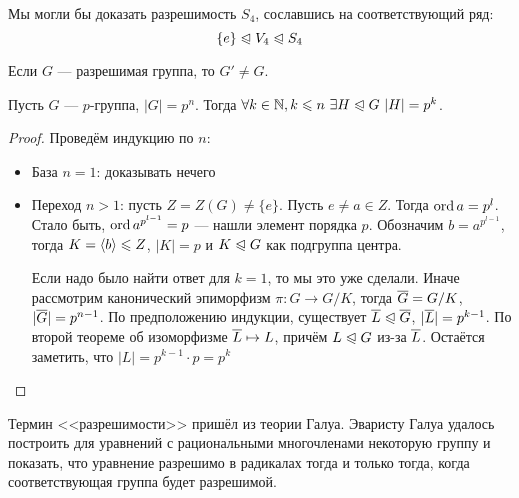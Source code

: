 \begin{note}
	Мы могли бы доказать разрешимость $S_4$, сославшись на соответствующий ряд:
	\[
		\{e\} \trianglelefteqslant V_4 \trianglelefteqslant S_4
	\]
\end{note}

\begin{corollary}
	Если $G$ --- разрешимая группа, то $G' \neq G$.
\end{corollary}

\begin{theorem}
	Пусть $G$ --- $p$-группа, $|G| = p^n$. Тогда $\forall k \in \mathbb{N}, k \leqslant n\ \exists H \trianglelefteqslant G\ |H| = p^k$.
\end{theorem}

\begin{proof}
	Проведём индукцию по $n$:
	\begin{itemize}
		\item База $n = 1$: доказывать нечего
		
		\item Переход $n > 1$: пусть $Z = Z(G) \neq \{e\}$. Пусть $e \neq a \in Z$. Тогда $\operatorname{ord} a = p^l$. Стало быть, $\operatorname{ord} a^{p^{l - 1}} = p$ --- нашли элемент порядка $p$. Обозначим $b = a^{p^{l - 1}}$, тогда $K = \left\langle b\right\rangle \leqslant Z$, $|K| = p$ и $K \trianglelefteqslant G$ как подгруппа центра.
		
		Если надо было найти ответ для $k = 1$, то мы это уже сделали. Иначе рассмотрим канонический эпиморфизм $\pi \colon G \to G / K$, тогда $\overline{G} = G / K$, $|\overline{G}| = p^{n - 1}$. По предположению индукции, существует $\overline{L} \trianglelefteqslant \overline{G}$, $|\overline{L}| = p^{k - 1}$. По второй теореме об изоморфизме $\overline{L} \mapsto L$, причём $L \trianglelefteqslant G$ из-за $\overline{L}$. Остаётся заметить, что $|L| = p^{k - 1} \cdot p = p^k$
	\end{itemize}
\end{proof}

\begin{note}
	Термин <<разрешимости>> пришёл из теории Галуа. Эваристу Галуа удалось построить для уравнений с рациональными многочленами некоторую группу и показать, что уравнение разрешимо в радикалах тогда и только тогда, когда соответствующая группа будет разрешимой.
\end{note}